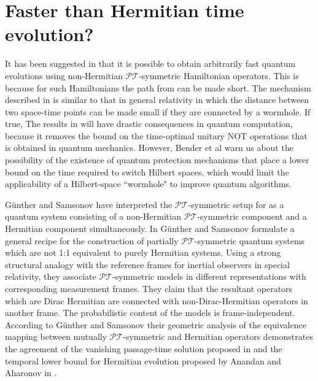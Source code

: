 \documentclass[12pt, a4paper]{report}
\newcommand\PT{\(\mathcal{PT}\)}
\begin{document}





\section{Faster than Hermitian time evolution?}\label{faster}
It has been suggested in \cite{Bender_2007} that it is possible to obtain arbitrarily fast quantum evolutions using non-Hermitian \PT-symmetric Hamiltonian operators. This is because for such Hamiltonians the path from can be made short. 
The mechanism described in \cite{Bender_2007} is similar to that in general relativity in which the distance between two space-time points can be made small if they are connected by a wormhole. If true, The results in \cite{Bender_2007} will have drastic consequences in quantum computation, because it removes the bound on the time-optimal unitary NOT operations\cite{OptimalControl} that is obtained in quantum mechanics\cite{Brachistochrone_Mostafazadeh}. However, Bender et al warn us about the possibility of the existence of quantum protection mechanisms that place a lower bound on the time required to switch Hilbert spaces. which would limit the applicability of a Hilbert-space ``wormhole" to improve quantum algorithms\cite{Bender_2007}. 

G\"{u}nther and Samsonov have interpreted the \PT-symmetric setup for \cite{Bender_2007} as a quantum system
consisting of a non-Hermitian \PT-symmetric component and a Hermitian component simultaneously. In \cite{Gunther_2008} G\"{u}nther and Samsonov formulate a general recipe for the construction of partially \PT-symmetric quantum
systems which are not 1:1 equivalent to purely Hermitian systems. Using a strong structural analogy with the
reference frames for inertial observers in special relativity, they associate \PT-symmetric models in different
representations with corresponding measurement frames. They claim that the resultant operators which are Dirac Hermitian
are connected with non-Dirac-Hermitian operators in another frame. The probabilistic content of the models
is frame-independent. According to G\"{u}nther and Samsonov their geometric analysis of the equivalence mapping between mutually \PT-symmetric and Hermitian operators demonstrates the agreement of the vanishing passage-time solution proposed in \cite{Bender_2007} and the temporal lower bound for Hermitian evolution proposed by Anandan and Aharonov in \cite{AnandanAharonov}. 
\end{document}
